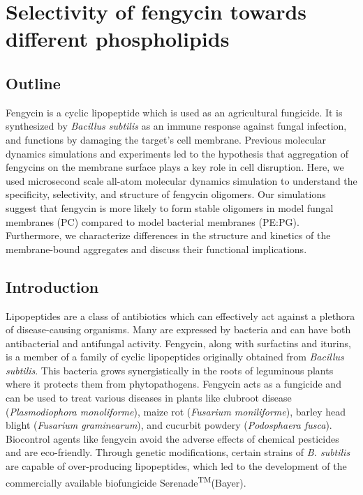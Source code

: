 \chapter{Selectivity of fengycin towards different phospholipids}
\label{c:chapter2}

\section{Outline}
\label{s:ch2_abstract}
Fengycin is a cyclic lipopeptide which is used as an
agricultural fungicide. It is synthesized by
\textit{Bacillus subtilis} as an immune response
against fungal infection, and functions by damaging
the target's cell membrane. Previous molecular dynamics
simulations and experiments led to the hypothesis that aggregation
of fengycins on the membrane surface plays a key role
in cell disruption. Here, we used microsecond scale
all-atom molecular dynamics simulation to understand
the specificity, selectivity, and structure of
fengycin oligomers. Our simulations suggest that
fengycin is more likely to form stable oligomers in
model fungal membranes (PC) compared to model
bacterial membranes (PE:PG). Furthermore, we
characterize differences in the structure and
kinetics of the membrane-bound aggregates and
discuss their functional implications.

\section{Introduction}
\label{s:ch2_intro}
Lipopeptides are a class of antibiotics which can effectively act against a
plethora of disease-causing organisms.\cite{Jacques2007} Many are
expressed by bacteria and can have both antibacterial and antifungal activity.
Fengycin, along with surfactins and iturins, is a member of a family of cyclic
lipopeptides originally obtained from \textit{Bacillus subtilis}. This bacteria
grows synergistically in the roots of leguminous plants where it protects them from
phytopathogens.\cite{Thonart2005} Fengycin acts as a fungicide and can be used
to treat various diseases in plants like clubroot disease (\textit{Plasmodiophora monoliforme}),
maize rot (\textit{Fusarium moniliforme}), barley
head blight (\textit{Fusarium graminearum}), and cucurbit powdery (\textit{Podosphaera fusca}).
\cite{Jung1986,Long2013,Yang2007,Chan2009,RomeroPerez2007} Biocontrol agents
like fengycin avoid the adverse effects of chemical pesticides and are
eco-friendly. Through genetic modifications, certain strains of \textit{B.
subtilis} are capable of over-producing lipopeptides, which led to the
development of the commercially available biofungicide
Serenade\textsuperscript{TM}(Bayer).

